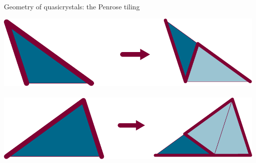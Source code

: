 \documentclass[xcolor=x11names,compress,professionalfonts]{beamer}
\renewcommand{\(}{\begin{columns}}
\renewcommand{\)}{\end{columns}}
\newcommand{\<}[1]{\begin{column}{#1}}
\renewcommand{\>}{\end{column}}
\begin{document}
\begin{frame}{Geometry of quasicrystals: the Penrose tiling}

\newcommand{\s}{.35}
  	\centering
    \includegraphics[scale=\s]{dart_dart.pdf}~~~~
    \includegraphics[scale=\s]{kate_kate.pdf}
    
    ~~~
    

\end{frame}
\end{document}
